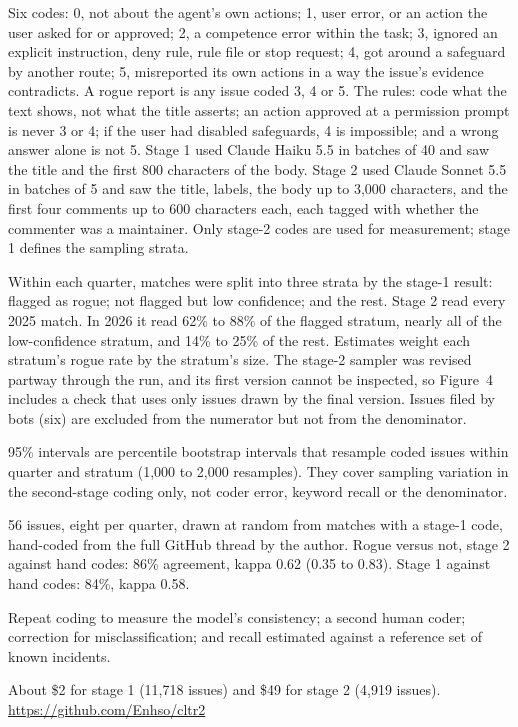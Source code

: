  Six codes: 0, not about the agent’s own actions; 1, user error, or an action the user asked for or approved; 2, a competence error within the task; 3, ignored an explicit instruction, deny rule, rule file or stop request; 4, got around a safeguard by another route; 5, misreported its own actions in a way the issue’s evidence contradicts. A rogue report is any issue coded 3, 4 or 5. The rules: code what the text shows, not what the title asserts; an action approved at a permission prompt is never 3 or 4; if the user had disabled safeguards, 4 is impossible; and a wrong answer alone is not 5. Stage 1 used Claude Haiku 5.5 in batches of 40 and saw the title and the first 800 characters of the body. Stage 2 used Claude Sonnet 5.5 in batches of 5 and saw the title, labels, the body up to 3,000 characters, and the first four comments up to 600 characters each, each tagged with whether the commenter was a maintainer.
Only stage-2 codes are used for measurement; stage 1 defines the sampling strata.

 Within each quarter, matches were split into three strata by the stage-1 result: flagged as rogue; not flagged but low confidence; and the rest. Stage 2 read every 2025 match. In 2026 it read 62\% to 88\% of the flagged stratum, nearly all of the low-confidence stratum, and 14\% to 25\% of the rest. Estimates weight each stratum’s rogue rate by the stratum’s size. The stage-2 sampler was revised partway through the run, and its first version cannot be inspected, so Figure~4 includes a check that uses only issues drawn by the final version. Issues filed by bots (six) are excluded from the numerator but not from the denominator.

 95\% intervals are percentile bootstrap intervals that resample coded issues within quarter and stratum (1,000 to 2,000 resamples). They cover sampling variation in the second-stage coding only, not coder error, keyword recall or the denominator.

 56 issues, eight per quarter, drawn at random from matches with a stage-1 code, hand-coded from the full GitHub thread by the author. Rogue versus not, stage 2 against hand codes: 86\% agreement, kappa 0.62 (0.35 to 0.83). Stage 1 against hand codes: 84\%, kappa 0.58.

 Repeat coding to measure the model’s consistency; a second human coder; correction for misclassification; and recall estimated against a reference set of known incidents.

 About \$2 for stage 1 (11,718 issues) and \$49 for stage 2 (4,919 issues). \url{https://github.com/Enhso/cltr2}
